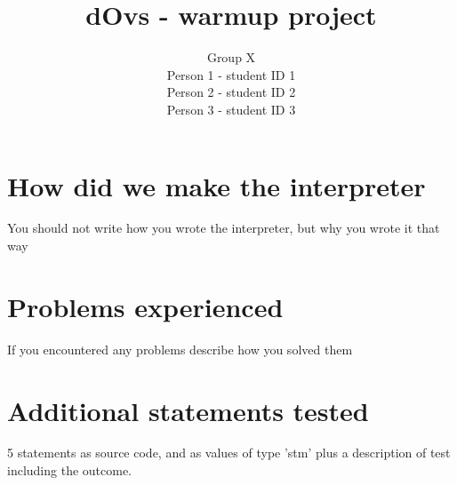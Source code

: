 \documentclass{article}
\title{dOvs - warmup project}
\author{
  Group X \\
  Person 1 - student ID 1\\
  Person 2 - student ID 2\\
  Person 3 - student ID 3
}
\begin{document}
\maketitle

\section{How did we make the interpreter}
You should not write how you wrote the interpreter, but why you wrote it that way

\section{Problems experienced}
If you encountered any problems describe how you solved them

\section{Additional statements tested}
5 statements as source code, and as values of type 'stm' plus a description of test including the outcome.
\end{document}
